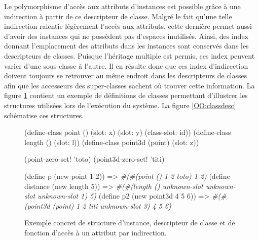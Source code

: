 \documentclass[12pt,twoside,letterpaper,francais]{book}
\newcommand{\schemeresult}[1]{{\it #1}}
\begin{document}
Le polymorphisme d'accès aux attributs d'instances est possible grâce
à une indirection à partir de ce descripteur de classe. Malgré le fait
qu'une telle indirection ralentie légèrement l'accès aux attributs,
cette dernière permet aussi d'avoir des instances qui ne possèdent pas
d'espaces inutilisés. Ainsi, des index donnant l'emplacement des
attributs dans les instances sont conservés dans les descripteurs de
classes. Puisque l'héritage multiple est permis, ces index peuvent
varier d'une sous-classe à l'autre. Il en résulte donc que ces index
d'indirection doivent toujours se retrouver au même endroit dans les
descripteurs de classes afin que les accesseurs des super-classes
sachent où trouver cette information. La figure \ref{OO:obj-struct}
contient un exemple de définitions de classes permettant d'illustrer
les structures utilisées lors de l'exécution du système. La figure
\ref{OO:classdesc} schématise ces structures.\\

\begin{figure}[htb!]
  \begin{schemecode}
(define-class point () (slot: x) (slot: y) (class-slot: id))
(define-class length () (slot: l))
(define-class point3d (point) (slot: z))

(point-zero-set! 'toto)
(point3d-zero-set! 'titi)

(define p (new point 1 2))
   => \schemeresult{\#(\#(point () 1 2 toto) 1 2)}
(define distance (new length 5)) 
   => \schemeresult{\#(\#(length () unknown-slot unknown-slot unknown-slot 1) 5)}
(define p2 (new point3d 4 5 6))  
   => \schemeresult{\#(\#(point3d (point) 1 2 titi unknown-slot 3) 4 5 6)}
  \end{schemecode}
  \caption{Exemple concret de structure d'instance, descripteur de
    classe et de fonction d'accès à un attribut par indirection.}
  \label{OO:obj-struct}
\end{figure}
\end{document}
